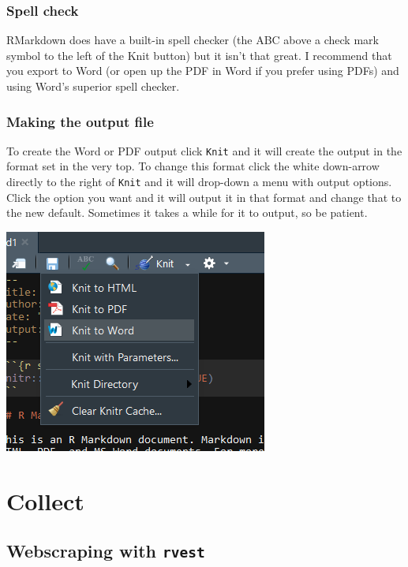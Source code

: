\documentclass[
  12pt,
]{book}
\begin{document}
\hypertarget{spell-check}{%
\section{Spell check}\label{spell-check}}

RMarkdown does have a built-in spell checker (the ABC above a check mark symbol to the left of the Knit button) but it isn't that great. I recommend that you export to Word (or open up the PDF in Word if you prefer using PDFs) and using Word's superior spell checker.

\hypertarget{making-the-output-file}{%
\section{Making the output file}\label{making-the-output-file}}

To create the Word or PDF output click \texttt{Knit} and it will create the output in the format set in the very top. To change this format click the white down-arrow directly to the right of \texttt{Knit} and it will drop-down a menu with output options. Click the option you want and it will output it in that format and change that to the new default. Sometimes it takes a while for it to output, so be patient.

\includegraphics{images/markdown4.PNG}

\hypertarget{part-collect}{%
\part{Collect}\label{part-collect}}

\hypertarget{webscraping-with-rvest}{%
\chapter{\texorpdfstring{Webscraping with \texttt{rvest}}{Webscraping with rvest}}\label{webscraping-with-rvest}}
\end{document}
